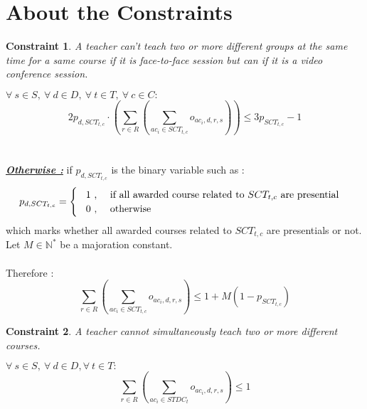 \documentclass[12pt,a4paper]{article}
\newtheorem{theorem}{Constraint}
\begin{document}
\section*{About the Constraints}

\begin{theorem}
A teacher can't teach two or more different groups at the same time for a same course if it is face-to-face session but can if it is a video conference session.
\end{theorem}
$
\forall \ s \in S,\ \forall \ d \in D, \ \forall \ t \in T, \ \forall \ c \in C :
$
\begin{equation}
2p_{d, SCT_{t,c}} \cdot \left( \sum_{r\in R}\left(\sum_{ac_{i} \in SCT_{t,c}}{o_{ac_{i}, d, r, s}}\right)\right) \leq 3p_{SCT_{t,c}} - 1
\end{equation}
\\ \\
\textbf{\textit{\underline{Otherwise :}}}
if $p_{d, SCT_{t,c}}$ is the binary variable such as :
\[
	p_{d, SCT_{t,c}} = 
	\begin{cases}
		\hspace{0.3cm} 1 \text{ , \quad if all awarded course related to $SCT_{t,c}$ are presential} \\
		\hspace{0.3cm}0 \text{ , \quad otherwise}
	\end{cases} 
\]	
which marks whether all awarded courses related to $SCT_{t,c}$ are presentials or not. \\

Let $M \in \mathbb{N^{*}}$ be a majoration constant. \\ \\
Therefore :
\begin{equation}
\sum_{r\in R}\left(\sum_{ac_{i} \in SCT_{t,c}}{o_{ac_{i}, d, r, s}}\right) \leq 1 + M(1 - p_{SCT_{t,c}})
\end{equation}

\begin{theorem}
A teacher cannot simultaneously teach two or more different courses.
\end{theorem}
$
\forall \ s \in S,\ \forall \ d \in D, \forall \ t \in T:
$
\begin{equation}
\sum_{r\in R}\left(\sum_{ac_i \in STDC_{t}}{o_{ac_{i}, d, r, s}}\right) \leq 1
\end{equation}
\end{document}
